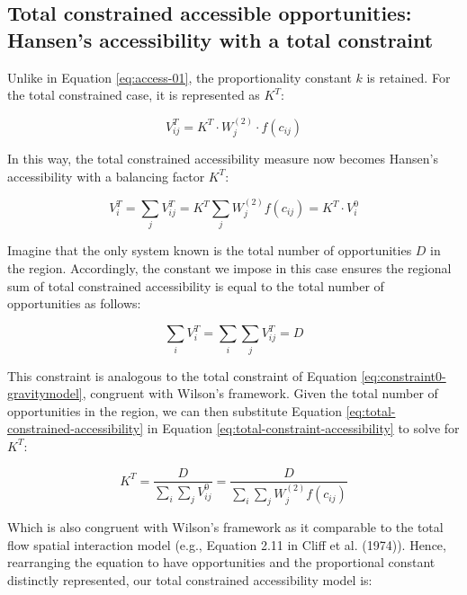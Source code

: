 \documentclass[
11pt, %
oneside, %
english, %
singlespacing, %
]{macthesis} %
\begin{document}
\subsection{Total constrained accessible opportunities: Hansen's accessibility with a total constraint}\label{total-constrained-accessible-opportunities-hansens-accessibility-with-a-total-constraint}

Unlike in Equation \ref{eq:access-01}, the proportionality constant \(k\) is retained. For the total constrained case, it is represented as \(K^T\):

\begin{equation}
\label{eq:total-constrained-access}
V^T_{ij} = K^T \cdot W_j^{(2)} \cdot f(c_{ij})
\end{equation} 

In this way, the total constrained accessibility measure now becomes Hansen's accessibility with a balancing factor \(K^T\):

\begin{equation}
\label{eq:total-constrained-accessibility}
V^T_i = \sum_j V^T_{ij} = K^T \sum_j W^{(2)}_jf(c_{ij}) = K^T \cdot V^0_i
\end{equation} 

Imagine that the only system known is the total number of opportunities \(D\) in the region. Accordingly, the constant we impose in this case ensures the regional sum of total constrained accessibility is equal to the total number of opportunities as follows:

\begin{equation}
\label{eq:total-constraint-accessibility}
\sum_i V^T_{i} = \sum_i\sum_j V^T_{ij} = D
\end{equation} 

This constraint is analogous to the total constraint of Equation \ref{eq:constraint0-gravitymodel}, congruent with Wilson's framework. Given the total number of opportunities in the region, we can then substitute Equation \ref{eq:total-constrained-accessibility} in Equation \ref{eq:total-constraint-accessibility} to solve for \(K^T\):

\begin{equation}
\label{eq:total-opportunity-balancing-factor}
K^T =\frac{D}{\sum_i\sum_j V^0_{ij}} = \frac{D}{\sum_i\sum_j W^{(2)}_jf(c_{ij})}
\end{equation} 

Which is also congruent with Wilson's framework as it comparable to the total flow spatial interaction model (e.g., Equation 2.11 in Cliff et al. (1974)). Hence, rearranging the equation to have opportunities and the proportional constant distinctly represented, our total constrained accessibility model is:
\end{document}
